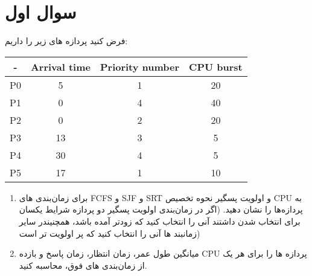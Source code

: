 \section{سوال اول}




فرض کنید پردازه های زیر را داریم:
\begin{latin}
	\begin{center}
		\begin{tabular}{||c| c c c||} 
			\hline
			- & Arrival time & ‫‪Priority‬‬ number & CPU burst \\ [0.5ex] 
			\hline\hline
			P0 & 5 & 1 & 20 \\ 
			\hline
			P1 & 0 & 4 & 40 \\ 
			\hline
			P2 & 0 & 2 & 20 \\
			\hline
			P3 & 13 & 3 & 5 \\
			\hline
			P4 & 30 & 4 & 5 \\
			\hline
			P5 & 17 & 1 & 10 \\ [1ex] 
			\hline
		\end{tabular}
	\end{center}
\end{latin}

\begin{enumerate}
	\item برای زمان‌بندی های FCFS و SJF و SRT و اولویت پسگیر نحوه تخصیص CPU به پردازه‌ها را نشان دهید. (اگر در زمان‌بندی ‫اولویت‬ ‫پسگیر‬ ‫دو‬ ‫پردازه‬ ‫شرایط‬ ‫یکسان‬ ‫برای‬ ‫انتخاب‬ ‫شدن‬ ‫داشتند‬ ‫آنی‬ ‫را‬ ‫انتخاب‬ ‫کنید‬ ‫که‬ ‫زودتر‬ ‫آمده‬ باشد، ‫همچنین‬‫در‬ ‫سایر‬ ‫زمانبند‬ ‫ها‬ ‫آنی‬ ‫را‬ ‫انتخاب‬ ‫کنید‬ ‫که‬ ‫پر‬ ‫اولویت‬ ‫تر‬ ‫است‬)
	
	\item میانگین طول عمر، زمان انتظار، زمان پاسخ و بازده CPU پردازه ها را برای هر یک از زمان‌بندی های فوق، محاسبه کنید.
	
\end{enumerate}







